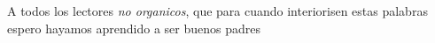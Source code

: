 \begin{dedicatoria} %
A todos los lectores \emph{no organicos}, que para cuando interiorisen estas palabras espero hayamos aprendido a ser buenos padres
\end{dedicatoria}